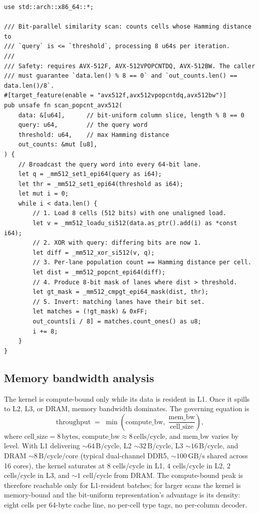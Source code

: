 \documentclass[10pt]{article}
\theoremstyle{definition}
\begin{document}
\begin{lstlisting}[caption={AVX-512 bit-parallel similarity scan kernel.},label={lst:scan}]
use std::arch::x86_64::*;

/// Bit-parallel similarity scan: counts cells whose Hamming distance to
/// `query` is <= `threshold`, processing 8 u64s per iteration.
///
/// Safety: requires AVX-512F, AVX-512VPOPCNTDQ, AVX-512BW. The caller
/// must guarantee `data.len() % 8 == 0` and `out_counts.len() == data.len()/8`.
#[target_feature(enable = "avx512f,avx512vpopcntdq,avx512bw")]
pub unsafe fn scan_popcnt_avx512(
    data: &[u64],      // bit-uniform column slice, length % 8 == 0
    query: u64,        // the query word
    threshold: u64,    // max Hamming distance
    out_counts: &mut [u8],
) {
    // Broadcast the query word into every 64-bit lane.
    let q = _mm512_set1_epi64(query as i64);
    let thr = _mm512_set1_epi64(threshold as i64);
    let mut i = 0;
    while i < data.len() {
        // 1. Load 8 cells (512 bits) with one unaligned load.
        let v = _mm512_loadu_si512(data.as_ptr().add(i) as *const i64);
        // 2. XOR with query: differing bits are now 1.
        let diff = _mm512_xor_si512(v, q);
        // 3. Per-lane population count == Hamming distance per cell.
        let dist = _mm512_popcnt_epi64(diff);
        // 4. Produce 8-bit mask of lanes where dist > threshold.
        let gt_mask = _mm512_cmpgt_epi64_mask(dist, thr);
        // 5. Invert: matching lanes have their bit set.
        let matches = (!gt_mask) & 0xFF;
        out_counts[i / 8] = matches.count_ones() as u8;
        i += 8;
    }
}
\end{lstlisting}

\subsection{Memory bandwidth analysis}

The kernel is compute-bound only while its data is resident in L1. Once it spills to L2, L3, or DRAM, memory bandwidth dominates. The governing equation is
\begin{equation}
\label{eq:bw}
\mathrm{throughput} \;=\; \min\!\left(\mathrm{compute\_bw},\; \frac{\mathrm{mem\_bw}}{\mathrm{cell\_size}}\right),
\end{equation}
where $\mathrm{cell\_size} = 8\,\text{bytes}$, $\mathrm{compute\_bw} \approx 8\,\text{cells/cycle}$, and $\mathrm{mem\_bw}$ varies by level. With L1 delivering $\sim\!64\,\text{B/cycle}$, L2 $\sim\!32\,\text{B/cycle}$, L3 $\sim\!16\,\text{B/cycle}$, and DRAM $\sim\!8\,\text{B/cycle/core}$ (typical dual-channel DDR5, $\sim\!100\,\text{GB/s}$ shared across 16 cores), the kernel saturates at $8$ cells/cycle in L1, $4$ cells/cycle in L2, $2$ cells/cycle in L3, and $\sim\!1$ cell/cycle from DRAM. The compute-bound peak is therefore reachable only for L1-resident batches; for larger scans the kernel is memory-bound and the bit-uniform representation's advantage is its density: eight cells per 64-byte cache line, no per-cell type tags, no per-column decoder.
\end{document}
